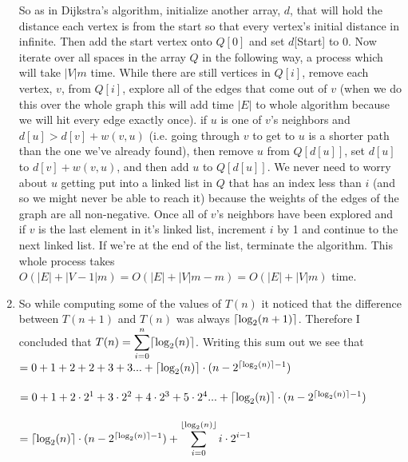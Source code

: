 \documentclass{article}
\begin{document}
\begin{enumerate}
	So as in Dijkstra's algorithm, initialize another array, $d$, that will hold the distance each vertex is from the start so that every vertex's initial distance in infinite.  Then add the start vertex onto $Q[0]$ and set $d$[Start] to 0.  Now iterate over all spaces in the array $Q$ in the following way, a process which will take $|V|m$ time.  While there are still vertices in $Q[i]$, remove each vertex, $v$, from $Q[i]$, explore all of the edges that come out of $v$ (when we do this over the whole graph this will add time $|E|$ to whole algorithm because we will hit every edge exactly once). if $u$ is one of $v$'s neighbors and $d[u] > d[v] + w(v,u)$ (i.e. going through $v$ to get to $u$ is a shorter path than the one we've already found), then remove $u$ from $Q[d[u]]$, set $d[u]$ to $d[v] + w(v,u)$, and then add $u$ to $Q[d[u]]$.  We never need to worry about $u$ getting put into a linked list in $Q$ that has an index less than $i$ (and so we might never be able to reach it) because the weights of the edges of the graph are all non-negative.  Once all of $v$'s neighbors have been explored and if $v$ is the last element in it's linked list, increment $i$ by 1 and continue to the next linked list.  If we're at the end of the list, terminate the algorithm.  This whole process takes $O(|E| + |V-1|m) = O(|E| + |V|m - m) = O(|E|+|V|m)$ time.  
	
	\item So while computing some of the values of $T(n)$ it noticed that the difference between $T(n+1)$ and $T(n)$ was always $\lceil \textup{log}_2(n+1)\rceil$.  Therefore I concluded that $T(n) = \displaystyle\sum_{i = 0}^{n}\lceil \textup{log}_2(n)\rceil$.  Writing this sum out we see that \\
	$=  0 + 1 + 2 + 2 + 3 + 3 ... + \lceil \textup{log}_2(n)\rceil \cdot (n - 2^{\lceil \textup{log}_2(n)\rceil - 1})$ \\\\
	$= 0 + 1 + 2 \cdot 2^1 + 3 \cdot 2 ^ 2 + 4 \cdot 2 ^ 3 + 5 \cdot 2 ^ 4... + \lceil \textup{log}_2(n)\rceil \cdot (n - 2^{\lceil \textup{log}_2(n)\rceil - 1}) $ \\\\
	$= \lceil\textup{log}_2(n)\rceil\cdot(n - 2^{\lceil\textup{log}_2(n)\rceil - 1}) + \displaystyle\sum_{i = 0}^{\lfloor \textup{log}_2(n) \rfloor} i \cdot 2^{i - 1}$\\\\
	

\end{enumerate}
\end{document}
